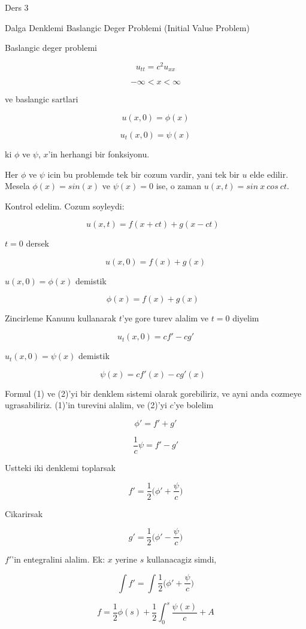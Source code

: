 \documentclass[12pt,fleqn]{article}\usepackage{../common}
\begin{document}
Ders 3

Dalga Denklemi Baslangic Deger Problemi (Initial Value Problem) 

Baslangic deger problemi 

\[ u_{tt} = c^2u_{xx} \]

\[ -\infty < x < \infty \]

ve baslangic sartlari 

\[ u(x,0) = \phi(x) \]

\[ u_t(x,0) = \psi(x) \]

ki $\phi$ ve $\psi$, $x$'in herhangi bir fonksiyonu. 

Her $\phi$ ve $\psi$ icin bu problemde tek bir cozum vardir, yani tek bir
$u$ elde edilir. Mesela $\phi(x) = sin(x)$ ve $\psi(x) = 0$ ise, o zaman
$u(x,t) = sin \ x \ cos \ ct$. 

Kontrol edelim. Cozum soyleydi:

\[ u(x,t) = f(x+ct) + g(x-ct) 
\ \ \ 
\label{5}
\]

$t=0$ dersek 

\[ u(x,0)  = f(x) + g(x) \]

$u(x,0) = \phi(x)$ demistik

\[ \phi(x) = f(x) + g(x) \ \ \ \label{1} \]

Zincirleme Kanunu kullanarak $t$'ye gore turev alalim ve $t=0$ diyelim

\[ u_t(x,0) = cf' - cg' \]

$u_t(x,0) = \psi(x)$ demistik

\[ \psi(x) = cf'(x) - cg'(x) \ \ \ \label{2} \]

Formul (1) ve (2)'yi bir denklem sistemi olarak gorebiliriz, ve ayni anda
cozmeye ugrasabiliriz. (1)'in turevini alalim, ve (2)'yi $c$'ye bolelim

\[ \phi' = f' + g' \]

\[ \frac{1}{c}\psi = f' - g' \]

Ustteki iki denklemi toplarsak

\[ f' = \frac{1}{2} \bigg( \phi' + \frac{\psi}{c}  \bigg) \]

Cikarirsak

\[ g' = \frac{1}{2}  \bigg( \phi' - \frac{\psi}{c}  \bigg) \]


$f'$'in entegralini alalim. Ek: $x$ yerine $s$ kullanacagiz simdi,

\[ \int f' = \int \frac{1}{2} \bigg( \phi' + \frac{\psi}{c}  \bigg) \]

\[ f = \frac{1}{2}\phi(s) + \frac{1}{2}\int_0^s \frac{\psi(x)}{c} + A\]
\end{document}
